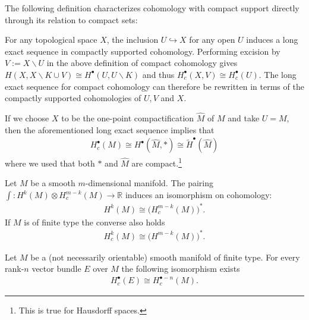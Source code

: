    The following definition characterizes cohomology with compact support directly through its relation to compact sets:
    \begin{property}\label{diff:reduced_compact_cohomology}
        For any topological space $X$, the inclusion $U\hookrightarrow X$ for any open $U$ induces a long exact sequence in compactly supported cohomology. Performing excision by $V:=X\backslash U$ in the above definition of compact cohomology gives $H(X, X\backslash K \cup V)\cong H^\bullet(U, U\backslash K)$ and thus $H^\bullet_c(X, V)\cong H^\bullet_c(U)$. The long exact sequence for compact cohomology can therefore be rewritten in terms of the compactly supported cohomologies of $U,V$ and $X$.

        If we choose $X$ to be the one-point compactification $\widehat{M}$ of $M$ and take $U=M$, then the aforementioned long exact sequence implies that
        \begin{gather}
            H^\bullet_c(M)\cong H^\bullet(\widehat{M}, \ast)\cong\widetilde{H}^\bullet(\widehat{M})
        \end{gather}
        where we used that both $\ast$ and $\widehat{M}$ are compact.\footnote{This is true for Hausdorff spaces.}
    \end{property}

    \begin{theorem}\label{diff:poincare_duality}
        Let $M$ be a smooth $m$-dimensional manifold. The pairing $\int:H^k(M)\otimes H^{m-k}_c(M)\rightarrow\mathbb{R}$ induces an isomorphism on cohomology:
        \begin{gather}
            H^k(M)\cong\Big(H^{m-k}_c(M)\Big)^*.
        \end{gather}
        If $M$ is of finite type the converse also holds
        \begin{gather}
            H^k_c(M)\cong\Big(H^{m-k}(M)\Big)^*.
        \end{gather}
    \end{theorem}
    \begin{result}
        Let $M$ be a (not necessarily orientable) smooth manifold of finite type. For every rank-$n$ vector bundle $E$ over $M$ the following isomorphism exists
        \begin{gather}
            H^\bullet_c(E)\cong H^{\bullet-n}_c(M).
        \end{gather}
    \end{result}


